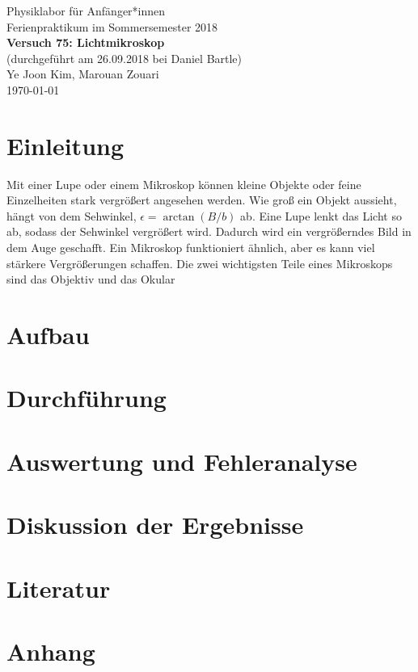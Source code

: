 \documentclass[11pt,a4paper]{article}
\begin{document}
	
	{
		\centering 
		\large 
		Physiklabor für Anfänger*innen \\
		Ferienpraktikum im Sommersemester 2018 \\[4mm]
		\textbf{\LARGE 
			Versuch 75: Lichtmikroskop
		} \\[3mm]
		(durchgeführt am 26.09.2018 bei Daniel Bartle) \\
		Ye Joon Kim, Marouan Zouari\\
		\today \\[10mm]
	}
	\tableofcontents
\section{Einleitung}
Mit einer Lupe oder einem Mikroskop können kleine Objekte oder feine Einzelheiten stark vergrößert angesehen werden. Wie groß ein Objekt aussieht, hängt von dem Sehwinkel, $\epsilon =\arctan(B/b)$ ab. Eine Lupe lenkt das Licht so ab, sodass der Sehwinkel vergrößert wird. Dadurch wird ein vergrößerndes Bild in dem Auge geschafft. Ein Mikroskop funktioniert ähnlich, aber es kann viel stärkere Vergrößerungen schaffen. Die zwei wichtigsten Teile eines Mikroskops sind das Objektiv und das Okular



\section{Aufbau}

\section{Durchführung}

\section{Auswertung und Fehleranalyse}

\section{Diskussion der Ergebnisse}

\section{Literatur}

\section{Anhang}


	
	
	
	
	
\end{document}
